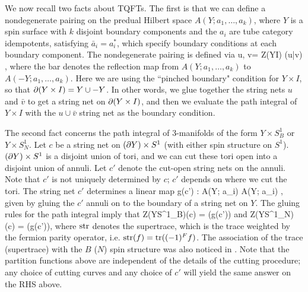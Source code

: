 \medskip

We now recall two facts about TQFTs.
The first is that we can define a nondegenerate pairing on the predual Hilbert
space $A(Y; a_1,\ldots,a_k)$, where $Y$ is a spin surface with $k$ disjoint boundary components 
and the $a_i$ are tube category idempotents, satisfying
$\bar a_i = a^*_i$, which specify boundary conditions at each boundary component.
The nondegenerate pairing is defined via
\be
	\langle u, v\rangle = Z(Y\times I) (u\cup \bar v) ,
\ee
where the bar denotes the reflection map from 
$A(Y; a_1,\ldots,a_k)$ to $A(-Y; a_1,\ldots,a_k)$.
Here we are using the ``pinched boundary" condition for $Y\times I$, so that $\partial (Y\times I) = Y\cup -Y$.
In other words, we glue together the string nets $u$ and $\bar v$ to get a string net on $\partial (Y\times I)$, and then we evaluate
the path integral of $Y\times I$ with the $u\cup \bar v$ string net as the boundary condition.

The second fact concerns the path integral of 3-manifolds of the form $Y\times S^1_B$ or $Y\times S^1_N$.
Let $c$ be a string net on $(\partial Y)\times S^1$ (with either spin structure on $S^1$).
$(\partial Y)\times S^1$ is a disjoint union of tori, and we can cut these tori open into a disjoint union of annuli.
Let $c'$ denote the cut-open string nets on the annuli.
Note that $c'$ is not uniquely determined by $c$; $c'$ depends on where we cut the tori.
The string net $c'$ determines a linear map
\be
	g(c') : A(Y; a_i) \to A(Y; a_i) ,
\ee
given by gluing the $c'$ annuli on to the boundary of a string net on $Y$.
The gluing rules for the path integral imply that
\be
\label{bounding_trace}
	Z(Y\times S^1_B)(c) = \tr(g(c'))
\ee
and
\be
\label{nonbounding_trace}
	Z(Y\times S^1_N)(c) = \str(g(c')),
\ee
where $\text{str}$ denotes the supertrace, which is the trace weighted by the fermion parity operator, i.e. $\text{str}(f) = \text{tr}((-1)^F f)$.
The association of the trace (supertrace) with the $B$ ($N$) spin structure was 
also noticed in \cite{turzillo2016}. 
Note that the partition functions above are independent of the details of the cutting procedure;
any choice of cutting curves and any choice of $c'$ will yield the same answer on the RHS above.


